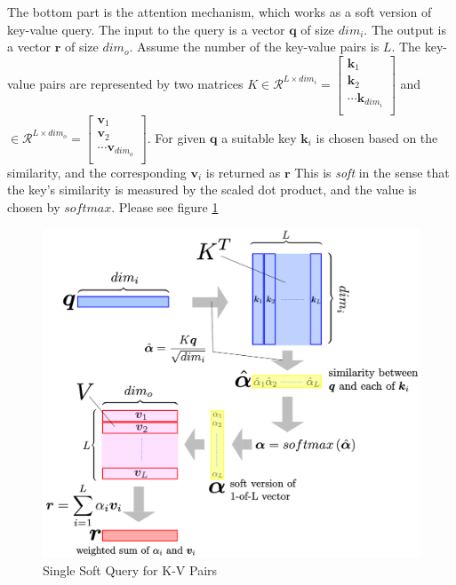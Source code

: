 \documentclass[a4]{article}
\begin{document}
The bottom part is the attention mechanism, which works as a soft version of key-value query.
The input to the query is a vector $\bm{q}$ of size $dim_i$. The output is a vector $\bm{r}$ of
size $dim_o$. Assume the number of the key-value pairs is $L$. The key-value pairs are
represented by two matrices $K \in \mathcal{R}^{L \times dim_i} = 
\begin{bmatrix}
\bm{k}_1\\
\bm{k}_2\\
\cdots
\bm{k}_{dim_i}\\
\end{bmatrix}
$ and
$ \in \mathcal{R}^{L \times dim_o} =
\begin{bmatrix}
\bm{v}_1\\
\bm{v}_2\\
\cdots
\bm{v}_{dim_o}\\
\end{bmatrix}
$. For given $\bm{q}$ a suitable key $\bm{k}_i$ is chosen based on the similarity, and the 
corresponding $\bm{v}_i$ is returned as $\bm{r}$
This is \emph{soft} in the sense that the key's similarity is measured by the scaled dot product,
and the value is chosen by $softmax$. Please see figure \ref{fig:transformer1}


\begin{figure}[!htb]
\centering
\includegraphics[width=12cm]{transformer1.png}
\caption{Single Soft Query for K-V Pairs}
\label{fig:transformer1}
\end{figure}
\end{document}
